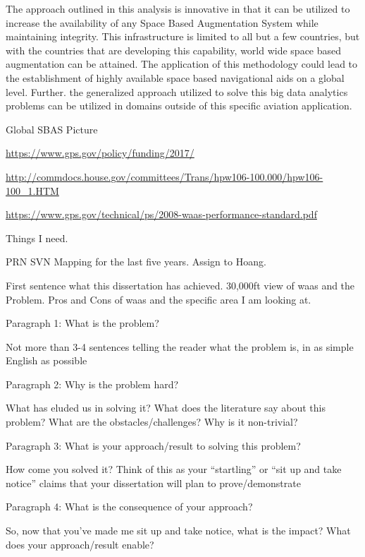 The approach outlined in this analysis is innovative in that it can be utilized to increase the availability of any Space Based Augmentation System while maintaining integrity.  This infrastructure is limited to all but a few countries, but with the countries that are developing this capability, world wide space based augmentation can be attained. The application of this methodology could lead to the establishment of highly available space based navigational aids on a global level. Further. the generalized approach utilized to solve this big data analytics problems can be utilized in domains outside of this specific aviation application.

Global SBAS Picture

\href{https://www.gps.gov/policy/funding/2017/}{https://www.gps.gov/policy/funding/2017/}

\href{http://commdocs.house.gov/committees/Trans/hpw106-100.000/hpw106-100\_1.HTM}{http://commdocs.house.gov/committees/Trans/hpw106-100.000/hpw106-100\_1.HTM}

\href{https://www.gps.gov/technical/ps/2008-waas-performance-standard.pdf}{https://www.gps.gov/technical/ps/2008-waas-performance-standard.pdf}

Things I need.

PRN SVN Mapping for the last five years.
Assign to Hoang.


First sentence what this dissertation has achieved.
30,000ft view of \ac{waas} and the Problem. Pros and Cons of \ac{waas} and the specific area I am looking at.

Paragraph 1: What is the problem?

Not more than 3-4 sentences telling the reader what the problem is, in as simple English as possible

Paragraph 2: Why is the problem hard?

What has eluded us in solving it? What does the literature say about this problem? What are the obstacles/challenges? Why is it non-trivial?

Paragraph 3: What is your approach/result to solving this problem?

How come you solved it? Think of this as your “startling” or “sit up and take notice” claims that your dissertation will plan to prove/demonstrate

Paragraph 4: What is the consequence of your approach?

So, now that you’ve made me sit up and take notice, what is the impact? What does your approach/result enable?
~\\

